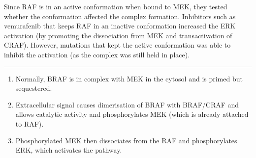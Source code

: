 \documentclass[a4paper,12pt]{article}
\begin{document}
Since RAF is in an active conformation when bound to MEK, they tested whether the conformation affected the complex formation.
Inhibitors such as vemurafenib that keeps RAF in an inactive conformation increased the ERK activation (by promoting the dissociation from MEK and transactivation of CRAF).
However, mutations that kept the active conformation was able to inhibit the activation (as the complex was still held in place).

\noindent\rule{\textwidth}{0.4pt}
\begin{enumerate}
\item Normally, BRAF is in complex with MEK in the cytosol and is primed but sequestered.
\item Extracellular signal causes dimerisation of BRAF with BRAF/CRAF and allows catalytic activity and phosphorylates MEK (which is already attached to RAF).
\item Phosphorylated MEK then dissociates from the RAF and phosphorylates ERK, which activates the pathway.
\end{enumerate}
\end{document}
